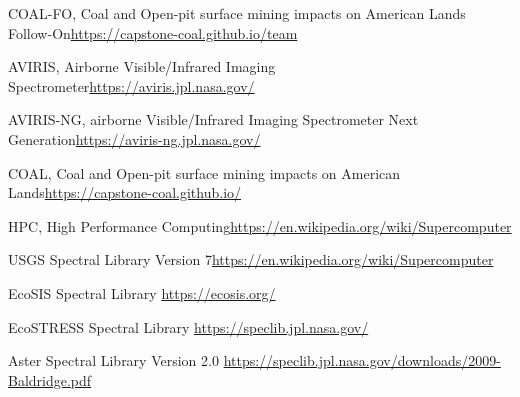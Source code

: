 \documentclass[a4paper,12pt]{article}
\begin{document}
\newline

\noindent [1] COAL-FO, Coal and Open-pit surface mining impacts on American Lands Follow-On\newline \url{https://capstone-coal.github.io/team} \newline

\noindent [2] AVIRIS, Airborne Visible/Infrared Imaging Spectrometer\newline \url{https://aviris.jpl.nasa.gov/} \newline

\noindent [3] AVIRIS-NG, airborne Visible/Infrared Imaging Spectrometer Next Generation\newline \url{https://aviris-ng.jpl.nasa.gov/}\newline

\noindent [4] COAL, Coal and Open-pit surface mining impacts on American Lands\newline \url{https://capstone-coal.github.io/} \newline

\noindent [5] HPC, High Performance Computing\newline \url{https://en.wikipedia.org/wiki/Supercomputer}\newline

\noindent [6] USGS Spectral Library Version 7\newline \url{https://en.wikipedia.org/wiki/Supercomputer}\newline

\noindent [7] EcoSIS Spectral Library \newline \url{https://ecosis.org/}\newline

\noindent [8] EcoSTRESS Spectral Library \newline \url{https://speclib.jpl.nasa.gov/}\newline

\noindent [9] Aster Spectral Library Version 2.0 \newline
\url{https://speclib.jpl.nasa.gov/downloads/2009-Baldridge.pdf}\newline
\end{document}

